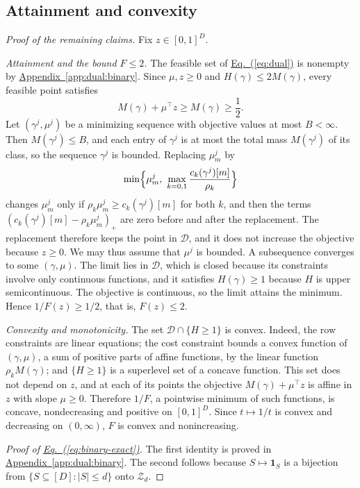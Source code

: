 \documentclass[11pt,a4paper]{article}
\newcommand{\Eqref}[1]{\hyperref[#1]{Eq.~(\ref*{#1})}}
\newcommand{\Appref}[1]{\hyperref[#1]{Appendix~\ref*{#1}}}
\theoremstyle{plain}
\begin{document}
\subsection{Attainment and convexity}\label{app:dual:convex}
\begin{proof}[Proof of the remaining claims]
Fix $z\in[0,1]^D$.

\emph{Attainment and the bound $F\le2$.}
The feasible set of \Eqref{eq:dual} is nonempty by
\Appref{app:dual:binary}. Since $\mu,z\ge0$ and
$H(\gamma)\le2M(\gamma)$, every feasible point satisfies
\[
M(\gamma)+\mu^\top z\ge M(\gamma)\ge\frac12.
\]
Let $(\gamma^j,\mu^j)$ be a minimizing sequence with objective values
at most $B<\infty$. Then $M(\gamma^j)\le B$, and each entry of
$\gamma^j$ is at most the total mass $M(\gamma^j)$ of its class, so the
sequence $\gamma^j$ is bounded. Replacing $\mu_m^j$ by
\[
\min\Bigl\{\mu_m^j,\ \max_{k=0,1}\frac{c_k(\gamma^j)[m]}{\rho_k}\Bigr\}
\]
changes $\mu_m^j$ only if $\rho_k\mu_m^j\ge c_k(\gamma^j)[m]$ for both
$k$, and then the terms $(c_k(\gamma^j)[m]-\rho_k\mu_m^j)_+$ are zero
before and after the replacement. The replacement therefore keeps the
point in $\mathcal D$, and it does not increase the objective because
$z\ge0$. We may thus assume that $\mu^j$ is bounded. A subsequence converges to some
$(\gamma,\mu)$. The limit lies in $\mathcal D$, which is closed because
its constraints involve only continuous functions, and it satisfies
$H(\gamma)\ge1$ because $H$ is upper semicontinuous. The objective is
continuous, so the limit attains the minimum. Hence $1/F(z)\ge1/2$,
that is, $F(z)\le2$.

\emph{Convexity and monotonicity.}
The set $\mathcal D\cap\{H\ge1\}$ is convex. Indeed, the row
constraints are linear equations; the cost constraint bounds a convex
function of $(\gamma,\mu)$, a sum of positive parts of affine
functions, by the linear function $\rho_kM(\gamma)$; and $\{H\ge1\}$ is
a superlevel set of a concave function. This set does not depend on
$z$, and at each of its points the objective $M(\gamma)+\mu^\top z$ is
affine in $z$ with slope $\mu\ge0$. Therefore $1/F$, a pointwise
minimum of such functions, is concave, nondecreasing and positive on
$[0,1]^D$. Since $t\mapsto1/t$ is convex and decreasing on
$(0,\infty)$, $F$ is convex and nonincreasing.

\emph{Proof of \Eqref{eq:binary-exact}.}
The first identity is proved in \Appref{app:dual:binary}. The second
follows because $S\mapsto\mathbf1_S$ is a bijection from
$\{S\subseteq[D]:|S|\le d\}$ onto $\mathcal Z_d$.
\end{proof}

\begingroup\small


\endgroup
\end{document}

